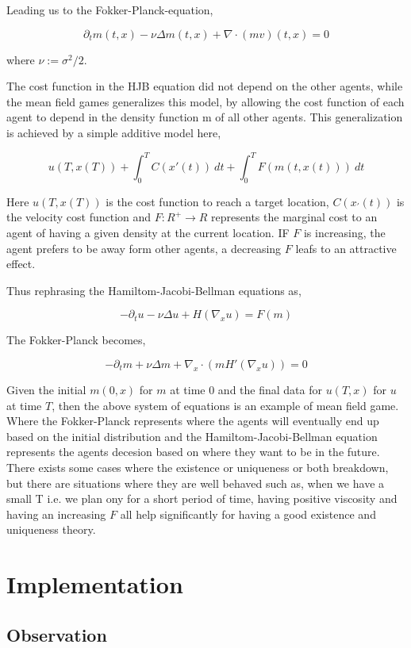 \documentclass[a4paper, 10pt, conference]{ieeeconf}      %
\begin{document}
Leading us to the Fokker-Planck-equation,

$$\displaystyle \partial_t m(t,x) - \nu \Delta m(t,x) + \nabla \cdot (mv)(t,x) = 0$$

where ${\nu := \sigma^2/2}$.


The cost function in the HJB equation did not depend on the other agents, while the mean field games generalizes this model, by allowing the cost function of each agent to depend in the density function m of all other agents. This generalization is achieved by a simple additive model here,

$$\displaystyle u(T, x(T)) + \int_0^T C(x'(t))\ dt + \int_0^T F(m(t,x(t)))\ dt$$

Here $u(T, x(T))$ is the cost function to reach a target location, $C(x_{'}(t))$ is the velocity cost function and $F: R^+ \rightarrow R$ represents the marginal cost to an agent of having a given density at the current location. IF $F$ is increasing, the agent prefers to be away form other agents, a decreasing $F$ leafs to an attractive effect.

Thus rephrasing the Hamiltom-Jacobi-Bellman equations as,

$$\displaystyle -\partial_t u - \nu \Delta u + H(\nabla_x u) = F(m)$$

The Fokker-Planck becomes,

$$\displaystyle - \partial_t m + \nu \Delta m + \nabla_x \cdot(m H'(\nabla_x u)) = 0$$

Given the initial $m(0,x)$ for $m$ at time 0 and the final data for $u(T,x)$ for $u$ at time $T$, then the above system of equations is an example of mean field game. Where the Fokker-Planck represents where the agents will eventually end up based on the initial distribution and the Hamiltom-Jacobi-Bellman equation represents the agents decesion based on where they want to be in the future. There exists some cases where the existence or uniqueness or both breakdown, but there are situations where they are well behaved such as, when we have a small T i.e. we plan ony for a short period of time, having positive viscosity and having an increasing $F$ all help significantly for having a good existence and uniqueness theory.

\section{Implementation}



\subsection{Observation}
\end{document}
